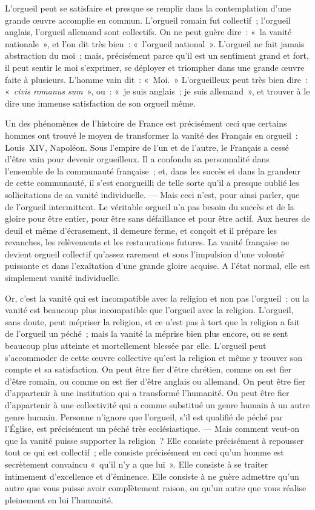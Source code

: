 \documentclass[french,twoside]{book} %
\begin{document}
L’orgueil peut se satisfaire et presque se remplir dans la contemplation d’une grande œuvre accomplie en commun. L’orgueil romain fut collectif ; l’orgueil anglais, l’orgueil allemand sont collectifs. On ne peut guère dire : « la vanité nationale », et l’on dit très bien : « l’orgueil national ». L’orgueil ne fait jamais abstraction du moi ; mais, précisément parce qu’il est un sentiment grand et fort, il peut sentir le moi s’exprimer, se déployer et triompher dans une grande œuvre faite à plusieurs. L’homme vain dit : « Moi. » L’orgueilleux peut très bien dire : « {\itshape civis romanus sum} », ou : « je suis anglais ; je suis allemand », et trouver à le dire une immense satisfaction de son orgueil même.\par
Un des phénomènes de l’histoire de France est précisément ceci que certains hommes ont trouvé le moyen de transformer la vanité des Français  en orgueil : Louis XIV, Napoléon. Sous l’empire de l’un et de l’autre, le Français a cessé d’être vain pour devenir orgueilleux. Il a confondu sa personnalité dans l’ensemble de la communauté française ; et, dans les succès et dans la grandeur de cette communauté, il s’est enorgueilli de telle sorte qu’il a presque oublié les sollicitations de sa vanité individuelle. — Mais ceci n’est, pour ainsi parler, que de l’orgueil intermittent. Le véritable orgueil n’a pas besoin du succès et de la gloire pour être entier, pour être sans défaillance et pour être actif. Aux heures de deuil et même d’écrasement, il demeure ferme, et conçoit et il prépare les revanches, les relèvements et les restaurations futures. La vanité française ne devient orgueil collectif qu’assez rarement et sous l’impulsion d’une volonté puissante et dans l’exaltation d’une grande gloire acquise. A l’état normal, elle est simplement vanité individuelle.\par
Or, c’est la vanité qui est incompatible avec la religion et non pas l’orgueil ; ou la vanité est beaucoup plus incompatible que l’orgueil avec la religion. L’orgueil, sans doute, peut mépriser la religion, et ce n’est pas à tort que la religion a fait de l’orgueil un péché ; mais la vanité la méprise bien plus encore, ou se sent beaucoup plus atteinte et mortellement blessée par elle. L’orgueil peut  s’accommoder de cette œuvre collective qu’est la religion et même y trouver son compte et sa satisfaction. On peut être fier d’être chrétien, comme on est fier d’être romain, ou comme on est fier d’être anglais ou allemand. On peut être fier d’appartenir à une institution qui a transformé l’humanité. On peut être fier d’appartenir à une collectivité qui a comme substitué un genre humain à un autre genre humain. Personne n’ignore que l’orgueil, s’il est qualifié de péché par l’Église, est précisément un péché très ecclésiastique. — Mais comment veut-on que la vanité puisse supporter la religion ? Elle consiste précisément à repousser tout ce qui est collectif ; elle consiste précisément en ceci qu’un homme est secrètement convaincu « qu’il n’y a que lui ». Elle consiste à se traiter intimement d’excellence et d’éminence. Elle consiste à ne guère admettre qu’un autre que vous puisse avoir complètement raison, ou qu’un autre que vous réalise pleinement en lui l’humanité.\par
\end{document}
